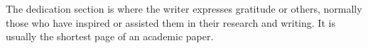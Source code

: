 The dedication section is where the writer expresses gratitude or others,
normally those who have inspired or assisted them in their research and writing.
It is usually the shortest page of an academic paper.